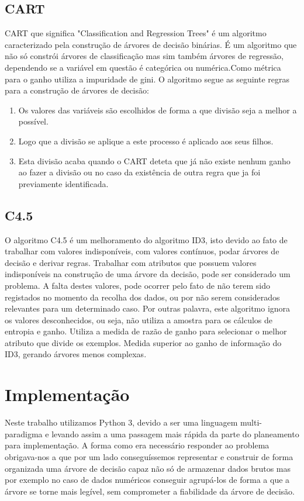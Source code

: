 \documentclass[12pt,a4paper]{article}
\begin{document}
\subsection{CART}
CART que significa "Classification and Regression Trees" é um algoritmo caracterizado pela construção de árvores de decisão binárias.\cite{rokach2005top} É um algoritmo que não só constrói árvores de classificação mas sim também árvores de regressão, dependendo se a variável em questão é categórica ou numérica.Como métrica para o ganho utiliza a impuridade de gini.
O algoritmo segue as seguinte regras para a construção de árvores de decisão:
\begin{enumerate}
	\item Os valores das variáveis são escolhidos de forma a que divisão seja a melhor a possível.
	\item Logo que a divisão se aplique a este processo é aplicado aos seus filhos.
	\item Esta divisão acaba quando o CART deteta que já não existe nenhum ganho ao fazer a divisão ou no caso da existência de outra regra que ja foi previamente identificada.  
\end{enumerate}

\subsection{C4.5}
O algoritmo C4.5 é um melhoramento do algoritmo ID3, isto devido ao fato de trabalhar com valores indisponíveis, com valores contínuos, podar árvores de decisão e derivar regras.
Trabalhar com atributos que possuem valores indisponíveis na construção de uma árvore da decisão, pode ser considerado um problema. A falta destes valores, pode ocorrer pelo fato de não terem sido registados no momento da recolha dos dados, ou por não serem considerados relevantes para um determinado caso.
Por outras palavra, este algoritmo ignora os valores desconhecidos, ou seja, não utiliza a amostra para os cálculos de entropia e ganho.
Utiliza a medida de razão de ganho para selecionar o melhor atributo que divide os exemplos. Medida superior ao ganho de informação do ID3, gerando árvores menos complexas.

\section{Implementação}
Neste trabalho utilizamos Python 3, devido a ser uma linguagem multi-paradigma e levando assim a uma passagem mais rápida da parte do planeamento para implementação.
A forma como era necessário responder ao problema obrigava-nos a que por um lado conseguíssemos representar e construir de forma organizada uma árvore de decisão capaz não só de armazenar dados brutos mas por exemplo no caso de dados numéricos conseguir agrupá-los de forma a que a árvore se torne mais legível, sem comprometer a fiabilidade da árvore de decisão.  
\end{document}
